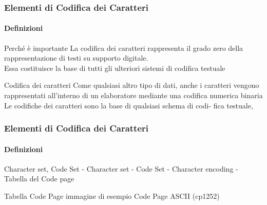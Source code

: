 \begin{frame}
    \frametitle{Elementi di Codifica dei Caratteri}
    \framesubtitle{Definizioni}
    \addtocounter{nframe}{1}
    
    \begin{block}{Perché è importante}
    La codifica dei caratteri rappresenta il grado zero della rappresentazione di testi su supporto digitale.
    \\ Essa costituisce la base di tutti gli ulteriori sistemi di codifica testuale
    \end{block}



    \begin{block}{Codifica dei caratteri}
        Come qualsiasi altro tipo di dati, anche i caratteri vengono rappresentati all’interno di un elaboratore mediante una codifica numerica binaria
        \\Le codifiche dei caratteri sono la base di qualsiasi schema di codi- fica testuale,
    \end{block}

\end{frame}

\begin{frame}
    \frametitle{Elementi di Codifica dei Caratteri}
    \framesubtitle{Definizioni}
    \addtocounter{nframe}{1}
    
    \begin{block}{Character set, Code Set}
     - Character set
     - Code Set
     - Character encoding
     - Tabella del Code page
    \end{block}

    \begin{block}{Tabella Code Page}
    immagine di esempio Code Page ASCII (cp1252)
    \end{block}

\end{frame}


